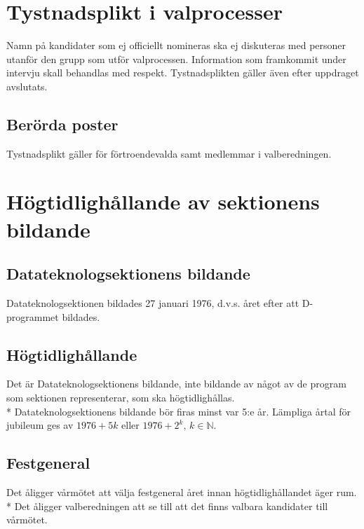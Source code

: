 \documentclass{datateknologsektionen-document}
\begin{document}
\section{Tystnadsplikt i valprocesser}
Namn på kandidater som ej officiellt nomineras ska ej diskuteras med personer utanför den grupp
som utför valprocessen. Information som framkommit under intervju skall behandlas med respekt.
Tystnadsplikten gäller även efter uppdraget avslutats.
\subsection{Berörda poster}
Tystnadsplikt gäller för förtroendevalda samt medlemmar i valberedningen.
\section{Högtidlighållande av sektionens bildande}
\subsection{Datateknologsektionens bildande}
Datateknologsektionen bildades 27 januari 1976, d.v.s. året efter att D-programmet bildades.

\subsection{Högtidlighållande}
Det är Datateknologsektionens bildande, inte bildande av något av de program som sektionen representerar, som ska högtidlighållas.\\*
Datateknologsektionens bildande bör firas minst var 5:e år. Lämpliga årtal för jubileum ges av \(1976
+ 5k\) eller \(1976 + 2^k\), \(k \in \mathbb{N}\).
\subsection{Festgeneral}
\label{hogtid}
Det åligger vårmötet att välja festgeneral året innan högtidlighållandet äger rum.\\*
Det åligger valberedningen att se till att det finns valbara kandidater till vårmötet.
\end{document}
